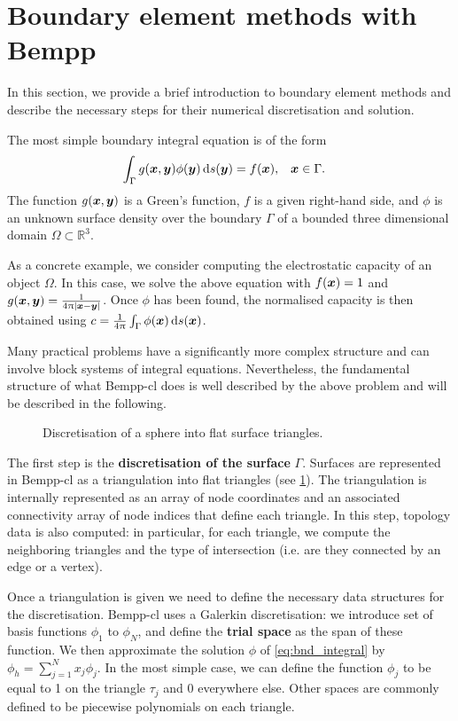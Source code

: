 \section{Boundary element methods with Bempp}
In this section, we provide a brief introduction to boundary element methods and describe the necessary steps for their numerical discretisation and solution.

The most simple boundary integral equation is of the form
\begin{align}
  \label{eq:bnd_integral}
  \int_{\Gamma} g(\bx, \by)\phi(\by)\ds[\by] &= f(\bx),&&\bx\in\Gamma.
\end{align}
The function $g(\boldsymbol{x}, \boldsymbol{y})$ is a Green's function, $f$ is a given right-hand side, and $\phi$ is an unknown surface density over the boundary $\Gamma$ of a bounded three dimensional domain $\Omega\subset\mathbb{R}^3$.

As a concrete example, we consider computing the electrostatic capacity of an object $\Omega$. In this case, we solve the above equation with $f(\boldsymbol{x})=1$ and $g(\boldsymbol{x},\boldsymbol{y})=\frac{1}{4\uppi|\boldsymbol{x} - \boldsymbol{y}|}$. Once $\phi$ has been found, the normalised capacity is then obtained using $c = \frac{1}{4\uppi}\int_{\Gamma}\phi(\bx)\ds[\bx]$.

Many practical problems have a significantly more complex structure and can involve block systems of integral equations. Nevertheless, the fundamental structure of what Bempp-cl does is well described by the above problem and will be described in the following.

\begin{figure}
  \centering
  
  \caption{Discretisation of a sphere into flat surface triangles.}
  \label{fig:triangulation}
\end{figure}

The first step is the \textbf{discretisation of the surface} $\Gamma$. Surfaces are represented in Bempp-cl as a triangulation into flat triangles (see \cref{fig:triangulation}). The triangulation is internally represented as an array of node coordinates and an associated connectivity array of node indices that define each triangle. In this step, topology data is also computed: in particular, for each triangle, we compute the neighboring triangles and the type of intersection (i.e. are they connected by an edge or a vertex).

Once a triangulation is given we need to define the necessary data structures for the discretisation. Bempp-cl uses a Galerkin discretisation: we introduce set of basis functions \(\phi_1\) to \(\phi_N\), and define the \textbf{trial space} as the span of these function. We then approximate the solution \(\phi\) of \cref{eq:bnd_integral} by $\phi_h=\sum_{j=1}^N x_j\phi_j$. In the most simple case, we can define the function \(\phi_j\) to be equal to 1 on the triangle $\tau_j$ and 0 everywhere else. Other spaces are commonly defined to be piecewise polynomials on each triangle.

